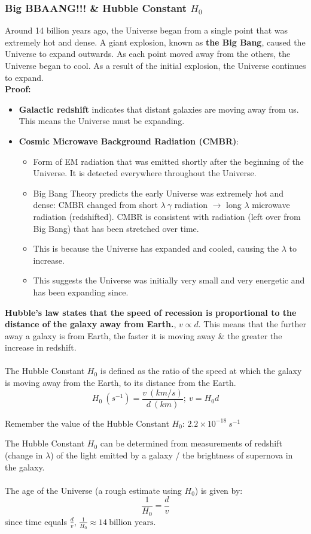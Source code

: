 \documentclass[a4paper,12pt]{article}
\begin{document}
\subsubsection{Big BBAANG!!! \& Hubble Constant \(H_0\)}
Around 14 billion years ago, the Universe began from a single point that was extremely hot and dense. A giant explosion, known as \textbf{the Big Bang}, caused the Universe to expand outwards.
As each point moved away from the others, the Universe began to cool.
As a result of the initial explosion, the Universe continues to expand.\\
\textbf{Proof:}
\begin{itemize}
    \item \textbf{Galactic redshift} indicates that distant galaxies are moving away from us. This means the Universe must be expanding.
    \item \textbf{Cosmic Microwave Background Radiation (CMBR)}:
    \begin{itemize}
        \item Form of EM radiation that was emitted shortly after the beginning of the Universe. It is detected everywhere throughout the Universe.
        \item Big Bang Theory predicts the early Universe was extremely hot and dense: CMBR changed from short \(\lambda\ \gamma\) radiation \(\to\) long \(\lambda\) microwave radiation (redshifted). CMBR is consistent with radiation (left over from Big Bang) that has been stretched over time.
        \item This is because the Universe has expanded and cooled, causing the \(\lambda\) to increase.
        \item This suggests the Universe was initially very small and very energetic and has been expanding since.
    \end{itemize}
\end{itemize}
\textbf{Hubble's law states that the speed of recession is proportional to the distance of the galaxy away from Earth.}, \(v \propto d\). 
This means that the further away a galaxy is from Earth, the faster it is moving away \& the greater the increase in redshift.\\\\
The Hubble Constant \(H_0\) is defined as the ratio of the speed at which the galaxy is moving away from the Earth, to its distance from the Earth.
\[H_0\ (s^{-1})=\frac{v\ (km/s)}{d\ (km)};\ v=H_0d\]
\begin{center}
    Remember the value of the Hubble Constant \(H_0\): \(2.2\times 10^{-18}\ s^{-1}\)
\end{center}
The Hubble Constant \(H_0\) can be determined from measurements of redshift (change in \(\lambda\)) of the light emitted by a galaxy / the brightness of supernova in the galaxy.\\\\
The age of the Universe (a rough estimate using \(H_0\)) is given by:
\[\frac{1}{H_0}=\frac{d}{v}\]
since time equals \(\frac{d}{v}\), \(\frac{1}{H_0}\approx 14\ \text{billion years}\).\\
\newpage
\end{document}
